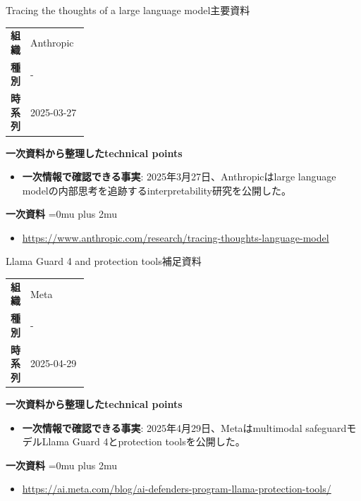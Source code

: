 \begin{technicalnote}{Tracing the thoughts of a large language model}{主要資料}
\begingroup
\begin{tabularx}{\linewidth}{@{}>{\bfseries}p{0.22\linewidth}X@{}}
組織 & Anthropic \\
種別 & - \\
時系列 & 2025-03-27 \\
\end{tabularx}
\smallskip
{\bfseries 一次資料から整理したtechnical points}
\begin{itemize}[leftmargin=1.5em,itemsep=0.35em]
\item \textbf{一次情報で確認できる事実}: 2025年3月27日、Anthropicはlarge language modelの内部思考を追跡するinterpretability研究を公開した。
\end{itemize}
\begin{samepage}
{\bfseries 一次資料}
\begingroup\sloppy
\Urlmuskip=0mu plus 2mu\relax
\begin{itemize}[leftmargin=1.5em,itemsep=0.25em]
\item {\scriptsize\url{https://www.anthropic.com/research/tracing-thoughts-language-model}}
\end{itemize}
\endgroup
\end{samepage}
\endgroup
\end{technicalnote}
\medskip

\begin{technicalnote}{Llama Guard 4 and protection tools}{補足資料}
\begingroup
\begin{tabularx}{\linewidth}{@{}>{\bfseries}p{0.22\linewidth}X@{}}
組織 & Meta \\
種別 & - \\
時系列 & 2025-04-29 \\
\end{tabularx}
\smallskip
{\bfseries 一次資料から整理したtechnical points}
\begin{itemize}[leftmargin=1.5em,itemsep=0.35em]
\item \textbf{一次情報で確認できる事実}: 2025年4月29日、Metaはmultimodal safeguardモデルLlama Guard 4とprotection toolsを公開した。
\end{itemize}
\begin{samepage}
{\bfseries 一次資料}
\begingroup\sloppy
\Urlmuskip=0mu plus 2mu\relax
\begin{itemize}[leftmargin=1.5em,itemsep=0.25em]
\item {\scriptsize\url{https://ai.meta.com/blog/ai-defenders-program-llama-protection-tools/}}
\end{itemize}
\endgroup
\end{samepage}
\endgroup
\end{technicalnote}
\medskip

